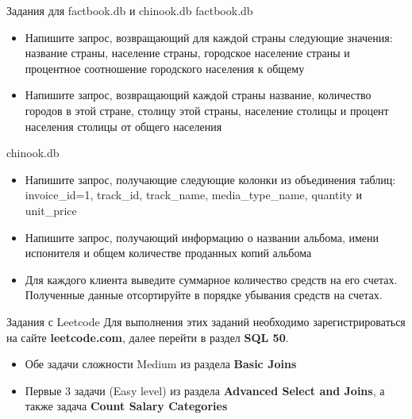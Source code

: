 \documentclass{beamer}
\begin{document}
\begin{frame}[fragile]{Задания для factbook.db и chinook.db}
	factbook.db
	\begin{itemize}
		\item Напишите запрос, возвращающий для каждой страны следующие значения: название страны, население страны, городское население страны и процентное соотношение городского населения к общему
		\item Напишите запрос, возвращающий каждой страны название, количество городов в этой стране, столицу этой страны, население столицы и процент населения столицы от общего населения
	\end{itemize}
	chinook.db
	\begin{itemize}
		\item Напишите запрос, получающие следующие колонки из объединения таблиц: invoice\_id=1, track\_id, track\_name, media\_type\_name, quantity и unit\_price
		\item Напишите запрос, получающий информацию о названии альбома, имени испонителя и общем количестве проданных копий альбома
		\item Для каждого клиента выведите суммарное количество средств на его счетах. Полученные данные отсортируйте в порядке убывания средств на счетах.
	\end{itemize}
\end{frame}

\begin{frame}[fragile]{Задания с Leetcode}
	Для выполнения этих заданий необходимо зарегистрироваться на сайте \textbf{leetcode.com}, далее перейти в раздел \textbf{SQL 50}.
	\begin{itemize}
		\item Обе задачи сложности Medium из раздела \textbf{Basic Joins}
		\item Первые 3 задачи (Easy level) из раздела \textbf{Advanced Select and Joins}, а также задача \textbf{Count Salary Categories}
	\end{itemize}
\end{frame}
\end{document}
